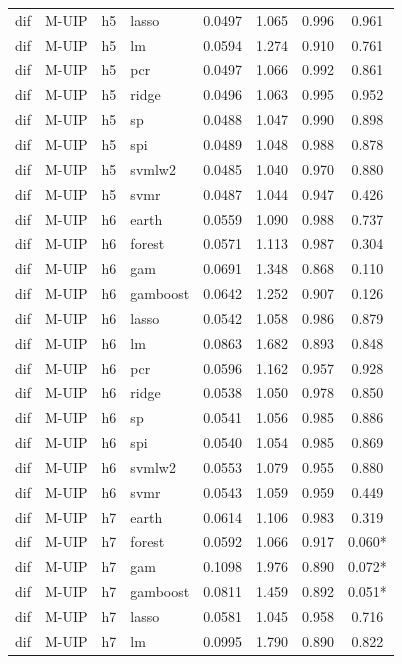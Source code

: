 \begin{ThreePartTable}
\begin{longtable}[t]{llclcccc}
dif & M-UIP & h5 & lasso & 0.0497 & 1.065 & 0.996 & 0.961\\
dif & M-UIP & h5 & lm & 0.0594 & 1.274 & 0.910 & 0.761\\
dif & M-UIP & h5 & pcr & 0.0497 & 1.066 & 0.992 & 0.861\\
dif & M-UIP & h5 & ridge & 0.0496 & 1.063 & 0.995 & 0.952\\
dif & M-UIP & h5 & sp & 0.0488 & 1.047 & 0.990 & 0.898\\
dif & M-UIP & h5 & spi & 0.0489 & 1.048 & 0.988 & 0.878\\
dif & M-UIP & h5 & svmlw2 & 0.0485 & 1.040 & 0.970 & 0.880\\
dif & M-UIP & h5 & svmr & 0.0487 & 1.044 & 0.947 & 0.426\\
\addlinespace
dif & M-UIP & h6 & earth & 0.0559 & 1.090 & 0.988 & 0.737\\
dif & M-UIP & h6 & forest & 0.0571 & 1.113 & 0.987 & 0.304\\
dif & M-UIP & h6 & gam & 0.0691 & 1.348 & 0.868 & 0.110\\
dif & M-UIP & h6 & gamboost & 0.0642 & 1.252 & 0.907 & 0.126\\
dif & M-UIP & h6 & lasso & 0.0542 & 1.058 & 0.986 & 0.879\\
dif & M-UIP & h6 & lm & 0.0863 & 1.682 & 0.893 & 0.848\\
dif & M-UIP & h6 & pcr & 0.0596 & 1.162 & 0.957 & 0.928\\
dif & M-UIP & h6 & ridge & 0.0538 & 1.050 & 0.978 & 0.850\\
dif & M-UIP & h6 & sp & 0.0541 & 1.056 & 0.985 & 0.886\\
dif & M-UIP & h6 & spi & 0.0540 & 1.054 & 0.985 & 0.869\\
dif & M-UIP & h6 & svmlw2 & 0.0553 & 1.079 & 0.955 & 0.880\\
dif & M-UIP & h6 & svmr & 0.0543 & 1.059 & 0.959 & 0.449\\
\addlinespace
dif & M-UIP & h7 & earth & 0.0614 & 1.106 & 0.983 & 0.319\\
dif & M-UIP & h7 & forest & 0.0592 & 1.066 & 0.917 & 0.060*\\
dif & M-UIP & h7 & gam & 0.1098 & 1.976 & 0.890 & 0.072*\\
dif & M-UIP & h7 & gamboost & 0.0811 & 1.459 & 0.892 & 0.051*\\
dif & M-UIP & h7 & lasso & 0.0581 & 1.045 & 0.958 & 0.716\\
dif & M-UIP & h7 & lm & 0.0995 & 1.790 & 0.890 & 0.822\\

\end{longtable}
\end{ThreePartTable}

